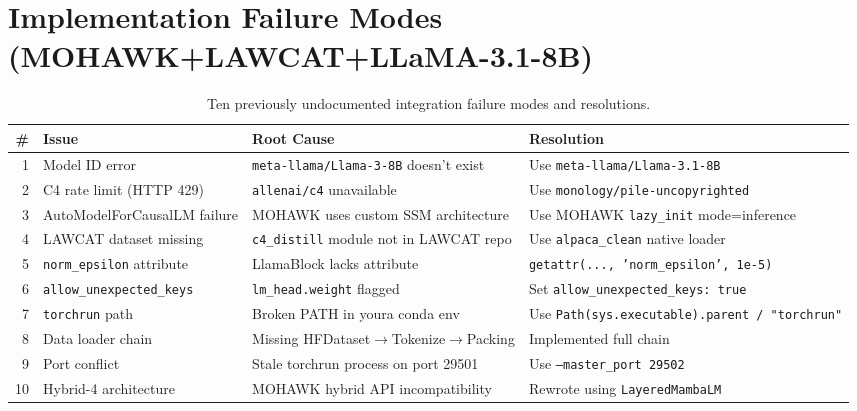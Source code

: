 \section{Implementation Failure Modes (MOHAWK+LAWCAT+LLaMA-3.1-8B)}
\label{sec:appendix}

\begin{table}[h]
\centering
\caption{Ten previously undocumented integration failure modes and resolutions.}
\label{tab:failures}
\begin{tabular}{rp{4.5cm}p{5cm}p{4cm}}
\toprule
\textbf{\#} & \textbf{Issue} & \textbf{Root Cause} & \textbf{Resolution} \\
\midrule
1  & Model ID error
   & \texttt{meta-llama/Llama-3-8B} doesn't exist
   & Use \texttt{meta-llama/Llama-3.1-8B} \\
2  & C4 rate limit (HTTP 429)
   & \texttt{allenai/c4} unavailable
   & Use \texttt{monology/pile-uncopyrighted} \\
3  & AutoModelForCausalLM failure
   & MOHAWK uses custom SSM architecture
   & Use MOHAWK \texttt{lazy\_init} mode=inference \\
4  & LAWCAT dataset missing
   & \texttt{c4\_distill} module not in LAWCAT repo
   & Use \texttt{alpaca\_clean} native loader \\
5  & \texttt{norm\_epsilon} attribute
   & LlamaBlock lacks attribute
   & \texttt{getattr(..., 'norm\_epsilon', 1e-5)} \\
6  & \texttt{allow\_unexpected\_keys}
   & \texttt{lm\_head.weight} flagged
   & Set \texttt{allow\_unexpected\_keys: true} \\
7  & \texttt{torchrun} path
   & Broken PATH in youra conda env
   & Use \texttt{Path(sys.executable).parent / "torchrun"} \\
8  & Data loader chain
   & Missing HFDataset$\to$Tokenize$\to$Packing
   & Implemented full chain \\
9  & Port conflict
   & Stale torchrun process on port 29501
   & Use \texttt{--master\_port 29502} \\
10 & Hybrid-4 architecture
   & MOHAWK hybrid API incompatibility
   & Rewrote using \texttt{LayeredMambaLM} \\
\bottomrule
\end{tabular}
\end{table}
